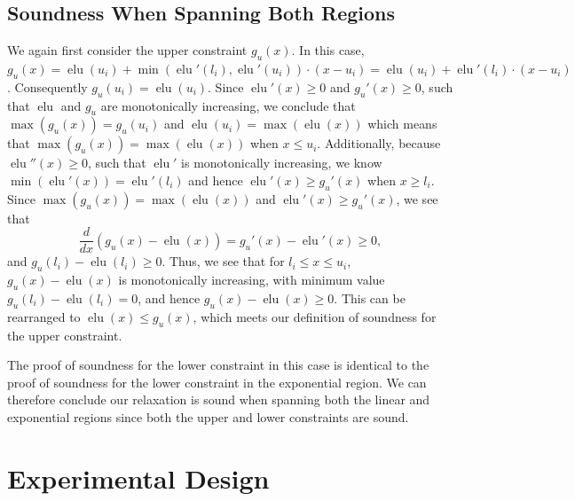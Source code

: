 \documentclass{llncs}
\DeclareMathOperator{\elu}{elu}
\begin{document}
\subsection{Soundness When Spanning Both Regions}
We again first consider the upper constraint $g_u(x)$.
In this case, $g_u(x) = \elu(u_i) + \min(\elu'(l_i), \elu'(u_i)) \cdot (x - u_i) = \elu(u_i) + \elu'(l_i) \cdot (x - u_i)$.
Consequently $g_u(u_i) = \elu(u_i)$.
Since $\elu'(x) \geq 0$ and $g_u'(x) \geq 0$, such that $\elu$ and $g_u$ are monotonically increasing, we conclude that $\max(g_u(x)) = g_u(u_i)$ and $\elu(u_i) = \max(\elu(x))$ which means that $\max(g_u(x)) = \max(\elu(x))$ when $x \leq u_i$.
Additionally, because $\elu''(x) \geq 0$, such that $\elu'$ is monotonically increasing, we know $\min(\elu'(x)) = \elu'(l_i)$ and hence $\elu'(x) \geq g_u'(x)$ when $x \geq l_i$.
Since $\max(g_u(x)) = \max(\elu(x))$ and $\elu'(x) \geq g_u'(x)$,
we see that 
$$ \frac{d}{dx}\left( g_u(x) - \elu(x) \right) = g_u'(x) - \elu'(x) \geq 0, $$
and $g_u(l_i) - \elu(l_i) \ge 0$.
Thus, we see that for $l_i \leq x \leq u_i$, $g_u(x) - \elu(x)$ is monotonically increasing, with minimum value $g_u(l_i) - \elu(l_i) = 0$, and hence $g_u(x) - \elu(x) \geq 0$.
This can be rearranged to $\elu(x) \leq g_u(x)$, which meets our definition of soundness for the upper constraint.

The proof of soundness for the lower constraint in this case is identical to the proof of soundness for the lower constraint in the exponential region. We can therefore conclude our relaxation is sound when spanning both the linear and exponential regions since both the upper and lower constraints are sound.


\section{Experimental Design}
\end{document}
